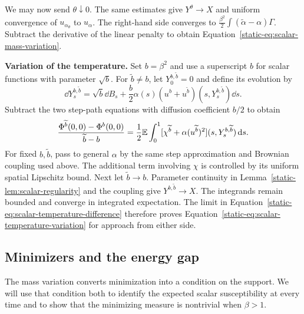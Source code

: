 We may now send $\theta\downarrow0$. The same estimates give
$Y^\theta\to X$ and uniform convergence of $u_{\alpha_\theta}$ to
$u_\alpha$. The right-hand side converges to
$\frac{\beta^2}{2}\int(\widetilde\alpha-\alpha)\Gamma$.
Subtract the derivative of the linear penalty to obtain
Equation~\eqref{static-eq:scalar-mass-variation}.

\par\medskip\noindent\textbf{Variation of the temperature.}\enspace
Set $b=\beta^2$ and use a superscript $b$ for scalar functions with
parameter $\sqrt b$. For $\widetilde b\ne b$, let
$Y^{b,\widetilde b}_0=0$ and define its evolution by
\[
 \dd Y_s^{b,\widetilde b}=\sqrt b\dd B_s
 +\frac b2\alpha(s)(u^b+u^{\widetilde b})
                (s,Y_s^{b,\widetilde b})\dd s.
\]
Subtract the two step-path equations with diffusion coefficient
$b/2$ to obtain
\begin{equation}\label{static-eq:scalar-temperature-difference}
 \frac{\Phi^{\widetilde b}(0,0)-\Phi^b(0,0)}{\widetilde b-b}
 =\frac12\mathbb E\int_0^1
       [\chi^{\widetilde b}+\alpha(u^{\widetilde b})^2]
                    (s,Y_s^{b,\widetilde b})\,\mathrm d s.
\end{equation}
For fixed $b,\widetilde b$, pass to general $\alpha$ by the same
step approximation and Brownian coupling used above. The additional
term involving $\chi$ is controlled by its uniform spatial
Lipschitz bound. Next let $\widetilde b\to b$. Parameter continuity
in Lemma~\ref{static-lem:scalar-regularity} and the coupling give
$Y^{b,\widetilde b}\to X$. The integrands remain bounded and
converge in integrated expectation. The limit in
Equation~\eqref{static-eq:scalar-temperature-difference} therefore
proves Equation~\eqref{static-eq:scalar-temperature-variation} for
approach from either side.

\subsection{Minimizers and the energy gap}

The mass variation converts minimization into a condition on the
support. We will use that condition both to identify the expected
scalar susceptibility at every time and to show that the minimizing
measure is nontrivial when $\beta>1$.

